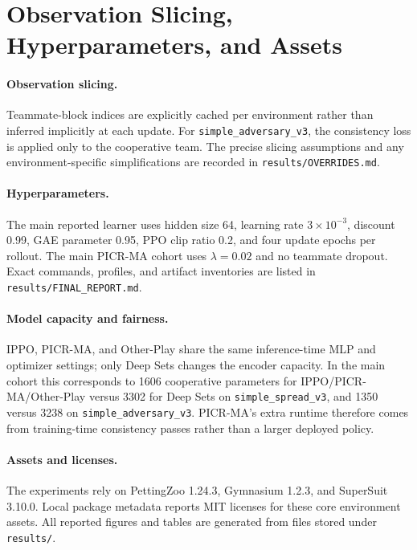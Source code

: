 \documentclass{article}
\begin{document}
\section{Observation Slicing, Hyperparameters, and Assets}
\paragraph{Observation slicing.}
Teammate-block indices are explicitly cached per environment rather than inferred implicitly at each update. For \texttt{simple\_adversary\_v3}, the consistency loss is applied only to the cooperative team. The precise slicing assumptions and any environment-specific simplifications are recorded in \texttt{results/OVERRIDES.md}.

\paragraph{Hyperparameters.}
The main reported learner uses hidden size 64, learning rate $3\times 10^{-3}$, discount 0.99, GAE parameter 0.95, PPO clip ratio 0.2, and four update epochs per rollout. The main PICR-MA cohort uses $\lambda=0.02$ and no teammate dropout. Exact commands, profiles, and artifact inventories are listed in \texttt{results/FINAL\_REPORT.md}.

\paragraph{Model capacity and fairness.}
IPPO, PICR-MA, and Other-Play share the same inference-time MLP and optimizer settings; only Deep Sets changes the encoder capacity. In the main cohort this corresponds to 1606 cooperative parameters for IPPO/PICR-MA/Other-Play versus 3302 for Deep Sets on \texttt{simple\_spread\_v3}, and 1350 versus 3238 on \texttt{simple\_adversary\_v3}. PICR-MA's extra runtime therefore comes from training-time consistency passes rather than a larger deployed policy.

\paragraph{Assets and licenses.}
The experiments rely on PettingZoo 1.24.3, Gymnasium 1.2.3, and SuperSuit 3.10.0. Local package metadata reports MIT licenses for these core environment assets. All reported figures and tables are generated from files stored under \texttt{results/}.


\end{document}

